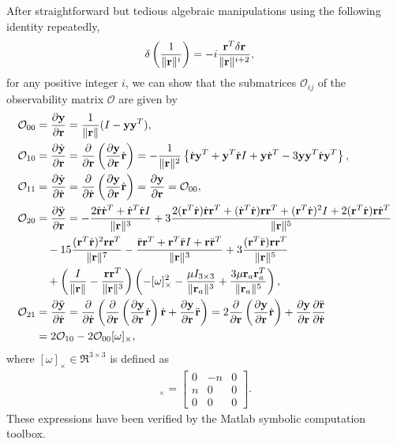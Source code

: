 After straightforward but tedious algebraic manipulations using the following identity repeatedly,
\begin{align*}
\delta \parenth{\frac{1}{\|\mathbf{r}\|^i}} 
& = -i\frac{ \mathbf{r}^T \delta \mathbf{r}}{\|\mathbf{r}\|^{i+2}},
\end{align*}
for any positive integer $i$, we can show that the submatrices $\mathcal{O}_{ij}$ of the observability matrix $\mathcal{O}$ are given by
\begin{align}
\mathcal{O}_{00} & = \deriv{\y}{\r} = \frac{1}{\|\r\|}(I - \y\y^T),\label{eqn:O_00}\\
\mathcal{O}_{10} & = \deriv{\dot\y}{\r} = \deriv{}{\r} \parenth{\deriv{\y}{\r}\dot \r}= -\frac{1}{\|\r\|^2}\braces{
{\dot\r\y^T +\y^T\dot\r I +\y\dot\r^T}
- 3\y\y^T\dot\r \y^T},\\
\mathcal{O}_{11} & = \deriv{\dot\y}{\dot\r} = \deriv{}{\dot\r} \parenth{\deriv{\y}{\r}\dot \r}= \deriv{\y}{\r} = \mathcal{O}_{00},\label{eqn:O11}\\
\mathcal{O}_{20} & = \deriv{\ddot\y}{\r} = -\dfrac{2\dot\r \dot\r^T  +\dot\r^T\dot\r I}{\|\r\|^3}
+3\dfrac{2(\r^T\dot\r) \dot\r\r^T +(\dot\r^T\dot\r)\r\r^T
+(\r^T\dot\r)^2 I
+2(\r^T\dot\r)\r  \dot\r^T
}{\|\r\|^5}\nonumber \\
&\quad- 15 \dfrac{(\r^T\dot\r)^2\r  \r^T}{\|\r\|^7}
-\dfrac{\ddot{\r}\r^T +\r^T\ddot{\r} I +\r \ddot{\r}^T}{\|\r\|^3}
+ 3 \dfrac{(\r^T\ddot{\r})\r \r^T}{\|\r\|^5}\nonumber\\
&\quad+\parenth{\dfrac{I}{\|\mathbf{r}\|} - \dfrac{\mathbf{r}\mathbf{r}^T}{\|\mathbf{r}\|^3}}
\parenth{-[\omega]_\times^2 -\dfrac{\mu I_{3\times 3}}{\|\r_a\|^3} + \dfrac{3\mu\r_a\r_a^T}{\|\r_a\|^5}},\\
\mathcal{O}_{21} & = \deriv{\ddot\y}{\dot\r} = \deriv{}{\dot\r}\parenth{\deriv{}{\r}\parenth{\deriv{\y}{\r}\dot\r}\dot\r + \deriv{\y}{\r}\ddot\r} = 2 \deriv{}{\r} \parenth{\deriv{\y}{\r}\dot\r} + \deriv{\y}{\r} \deriv{\ddot\r}{\dot\r}
\nonumber\\
&  = 2\mathcal{O}_{10} 
- 2 \mathcal{O}_{00}[\omega]_\times,\label{eqn:O_21}
\end{align}
where $[\omega]_\times\in\Re^{3\times 3}$ is defined as
\begin{align*}
[\omega]_\times = \begin{bmatrix} 0 & -n & 0 \\ n & 0 & 0 \\ 0 & 0 & 0 \end{bmatrix}.
\end{align*}
These expressions have been verified by the Matlab symbolic computation toolbox.

